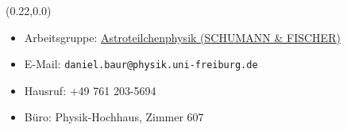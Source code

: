\documentclass[aspectratio=169, 14pt]{beamer}
\begin{document}
\begin{frame}
    \begin{textblock*}{2\paperwidth}(0.22\paperwidth,0.0\paperheight)
        \vspace*{2.0cm}
        \begin{itemize}
            \setlength\itemsep{16pt}
            \item Arbeitsgruppe: \textcolor{uniblau}{\href{https://www.app.uni-freiburg.de/}{Astroteilchenphysik ({\fontsize{14}{10}\selectfont S}{\fontsize{8}{10}\selectfont CHUMANN} \& {\fontsize{14}{10}\selectfont F}{\fontsize{8}{10}\selectfont ISCHER})}}
            \item E-Mail: \texttt{daniel.baur@physik.uni-freiburg.de}
            \item Hausruf: +49 761 203-5694
            \item Büro: Physik-Hochhaus, Zimmer 607
        \end{itemize}
    \end{textblock*}
\end{frame}
\end{document}
